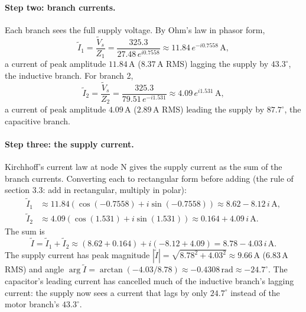 \paragraph{Step two: branch currents.} Each branch sees the full
supply voltage. By Ohm's law in phasor form,
\[
\tilde I_{1} = \frac{\tilde V_{s}}{Z_{1}}
= \frac{325.3}{27.48\,e^{i 0.7558}}
\approx 11.84\,e^{-i 0.7558}\,\si{\ampere},
\]
a current of peak amplitude $11.84\,\si{\ampere}$ ($8.37\,\si{\ampere}$
RMS) lagging the supply by $43.3^{\circ}$, the inductive branch. For
branch 2,
\[
\tilde I_{2} = \frac{\tilde V_{s}}{Z_{2}}
= \frac{325.3}{79.51\,e^{-i 1.531}}
\approx 4.09\,e^{i 1.531}\,\si{\ampere},
\]
a current of peak amplitude $4.09\,\si{\ampere}$ ($2.89\,\si{\ampere}$
RMS) leading the supply by $87.7^{\circ}$, the capacitive branch.

\paragraph{Step three: the supply current.} Kirchhoff's current law
at node $\mathrm{N}$ gives the supply current as the sum of the branch
currents. Converting each to rectangular form before adding (the rule
of section 3.3: add in rectangular, multiply in polar):
\begin{align*}
\tilde I_{1} &\approx 11.84(\cos(-0.7558) + i\sin(-0.7558))
  \approx 8.62 - 8.12\,i\,\si{\ampere}, \\
\tilde I_{2} &\approx 4.09(\cos(1.531) + i\sin(1.531))
  \approx 0.164 + 4.09\,i\,\si{\ampere}.
\end{align*}
The sum is
\[
\tilde I = \tilde I_{1} + \tilde I_{2}
\approx (8.62 + 0.164) + i(-8.12 + 4.09)
= 8.78 - 4.03\,i\,\si{\ampere}.
\]
The supply current has peak magnitude $|\tilde I| = \sqrt{8.78^{2} +
4.03^{2}} \approx 9.66\,\si{\ampere}$ ($6.83\,\si{\ampere}$ RMS) and
angle $\arg \tilde I = \arctan(-4.03/8.78) \approx -0.4308\,\text{rad}
\approx -24.7^{\circ}$. The capacitor's leading current has cancelled
much of the inductive branch's lagging current: the supply now sees a
current that lags by only $24.7^{\circ}$ instead of the
motor branch's $43.3^{\circ}$.

